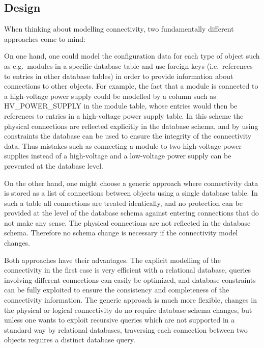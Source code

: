 
\begingroup
\newcommand{\sql}[1]{\texttt{#1}}

\subsection{Design}


When thinking about modelling connectivity, two fundamentally
different approaches come to mind:

On one hand, one could model the configuration data for each type of
object such as e.g.\ modules in a specific database table and use
foreign keys (i.e.\ references to entries in other database tables) in
order to provide information about connections to other objects. For
example, the fact that a module is connected to a high-voltage power
supply could be modelled by a column such as HV\_POWER\_SUPPLY in the module
table, whose entries would then be references to entries in a
high-voltage power supply table. In this scheme the physical
connections are reflected explicitly in the database schema, and by
using constraints the database can be used to ensure the integrity of
the connectivity data.  Thus mistakes such as connecting a module to
two high-voltage power supplies instead of a high-voltage and a
low-voltage power supply can be prevented at the database level.

On the other hand, one might choose a generic approach where
connectivity data is stored as a list of connections between objects
using a single database table. In such a table all connections are
treated identically, and no protection can be provided at the level of
the database schema against entering connections that do not make any sense. The
physical connections are not reflected in the database schema.
Therefore no schema change is necessary if the connectivity model
changes.

Both approaches have their advantages. The explicit modelling of the
connectivity in the first case is very efficient with a relational
database, queries involving different connections can easily be
optimized, and database constraints can be fully exploited to ensure
the consistency and completeness of the connectivity information. The
generic approach is much more flexible, changes in the physical or
logical connectivity do no require database schema changes, but unless one
wants to exploit recursive queries which are not supported in a
standard way by relational databases, traversing each connection
between two objects requires a distinct database query.


